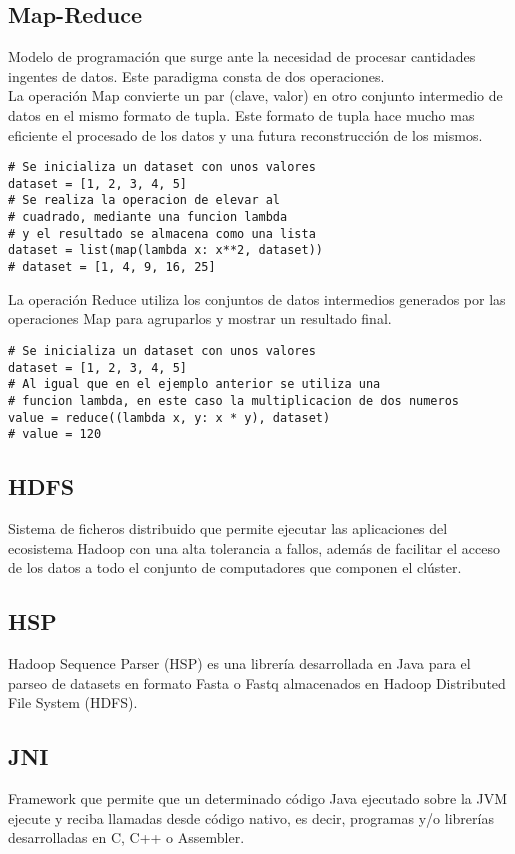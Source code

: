 \documentclass[conference]{IEEEtran}
\begin{document}
\subsection{Map-Reduce}
Modelo de programación que surge ante la necesidad de procesar cantidades ingentes de datos. Este paradigma consta de dos operaciones.\\

La operación Map convierte un par (clave, valor) en otro conjunto intermedio de datos en el mismo formato de tupla. Este formato de tupla hace mucho mas eficiente el procesado de los datos y una futura reconstrucción de los mismos.\\

\begin{lstlisting}
# Se inicializa un dataset con unos valores
dataset = [1, 2, 3, 4, 5]
# Se realiza la operacion de elevar al 
# cuadrado, mediante una funcion lambda
# y el resultado se almacena como una lista
dataset = list(map(lambda x: x**2, dataset))
# dataset = [1, 4, 9, 16, 25]
\end{lstlisting}

La operación Reduce utiliza los conjuntos de datos intermedios generados por las operaciones Map para agruparlos y mostrar un resultado final.

\begin{lstlisting}
# Se inicializa un dataset con unos valores
dataset = [1, 2, 3, 4, 5]
# Al igual que en el ejemplo anterior se utiliza una
# funcion lambda, en este caso la multiplicacion de dos numeros
value = reduce((lambda x, y: x * y), dataset)
# value = 120
\end{lstlisting}

\subsection{HDFS}
Sistema de ficheros distribuido que permite ejecutar las aplicaciones del ecosistema Hadoop con una alta tolerancia a fallos, además de facilitar el acceso de los datos a todo el conjunto de computadores que componen el clúster.

\subsection{HSP}
Hadoop Sequence Parser (HSP) es una librería desarrollada en Java para el parseo de datasets en formato Fasta o Fastq almacenados en Hadoop Distributed File System (HDFS).

\subsection{JNI}
Framework que permite que un determinado código Java ejecutado sobre la JVM ejecute y reciba llamadas desde código nativo, es decir, programas y/o librerías desarrolladas en C, C++ o Assembler.
\end{document}
